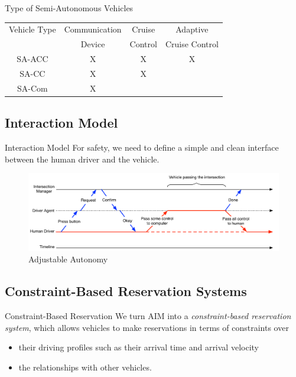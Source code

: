 \documentclass{beamer}
\begin{document}
\begin{frame}{Type of Semi-Autonomous Vehicles}
\begin{tabular}{|c|c|c|c|}
  \hline
  Vehicle Type & Communication & Cruise & Adaptive \\
               & Device & Control & Cruise Control \\
  \hline
  SA-ACC & X & X & X  \\
  \hline
  SA-CC & X & X &  \\
  \hline
  SA-Com & X & &  \\
  \hline
\end{tabular}
\end{frame}

\subsection{Interaction Model}

\begin{frame}{Interaction Model}
For safety, we need to define a simple and clean interface between the
human driver and the vehicle.\pause

\begin{figure}
	\includegraphics[width=\textwidth]{figures/interaction}
	\caption{Adjustable Autonomy}
\end{figure}
\end{frame}

\subsection{Constraint-Based Reservation Systems}

\begin{frame}{Constraint-Based Reservation}
We turn AIM into a \emph{constraint-based reservation system}, which
allows vehicles to make reservations in terms of constraints over
\begin{itemize}
\item their driving profiles such as their arrival time and arrival velocity
\item the relationships with other vehicles.
\end{itemize}
\end{frame}
\end{document}
